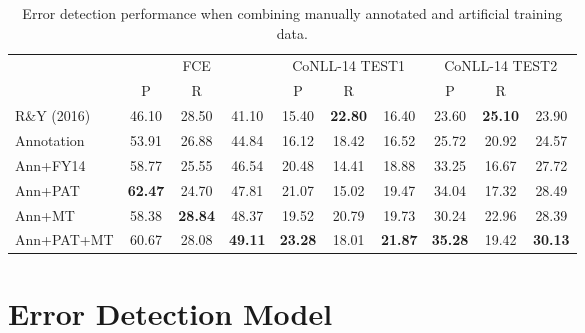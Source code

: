\documentclass[11pt,letterpaper]{article}
\begin{document}
\begin{table*}[t]
\setlength\tabcolsep{8pt}
\begin{tabular}{l|ccc|ccc|ccc} \hline
 & \multicolumn{3}{c|}{FCE} & \multicolumn{3}{c|}{CoNLL-14 TEST1} & \multicolumn{3}{c}{CoNLL-14 TEST2} \\ 
 & {\small P} & {\small R} & {\small } & {\small P} & {\small R} & {\small } & {\small P} & {\small R} & {\small } \\\hline
R\&Y (2016) & 46.10 & 28.50 & 41.10 & 15.40 & \textbf{22.80} & 16.40 & 23.60 & \textbf{25.10} & 23.90\\ \hline
Annotation & 53.91 & 26.88 & 44.84 & 16.12 & 18.42 & 16.52 & 25.72 & 20.92 & 24.57\\
Ann+FY14 & 58.77 & 25.55 & 46.54 & 20.48 & 14.41 & 18.88 & 33.25 & 16.67 & 27.72\\
Ann+PAT & \textbf{62.47} & 24.70 & 47.81 & 21.07 & 15.02 & 19.47 & 34.04 & 17.32 & 28.49\\
Ann+MT & 58.38 & \textbf{28.84} & 48.37 & 19.52 & 20.79 & 19.73 & 30.24 & 22.96 & 28.39\\
Ann+PAT+MT & 60.67 & 28.08 & \textbf{49.11} & \textbf{23.28} & 18.01 & \textbf{21.87} & \textbf{35.28} & 19.42 & \textbf{30.13} \\ \hline
\end{tabular}
\caption{Error detection performance when combining manually annotated and artificial training data.}
\label{tab:add}
\end{table*}







\section{Error Detection Model}
\label{sec:model}
\end{document}

